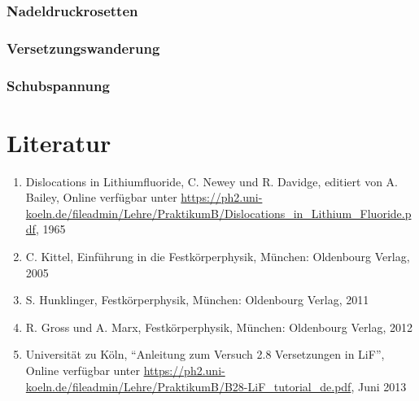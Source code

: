 \documentclass[12pt,a4paper]{scrartcl}
\numberwithin{equation}{section} %
\renewcommand{\[}{} %
\renewcommand{\]}{\noindent} %
\newcommand{\tightlist}{} %
\begin{document}
\hypertarget{nadeldruckrosetten-1}{%
\subsubsection{Nadeldruckrosetten}\label{nadeldruckrosetten-1}}

\hypertarget{versetzungswanderung}{%
\subsubsection{Versetzungswanderung}\label{versetzungswanderung}}

\hypertarget{schubspannung}{%
\subsubsection{Schubspannung}\label{schubspannung}}

\hypertarget{literatur}{%
\section{Literatur}\label{literatur}}

\begin{enumerate}
\def\labelenumi{\arabic{enumi}.}
\tightlist
\item
  Dislocations in Lithiumfluoride, C. Newey und R. Davidge, editiert von
  A. Bailey, Online verfügbar unter
  \url{https://ph2.uni-koeln.de/fileadmin/Lehre/PraktikumB/Dislocations_in_Lithium_Fluoride.pdf},
  1965
\item
  C. Kittel, Einführung in die Festkörperphysik, München: Oldenbourg
  Verlag, 2005
\item
  S. Hunklinger, Festkörperphysik, München: Oldenbourg Verlag, 2011
\item
  R. Gross und A. Marx, Festkörperphysik, München: Oldenbourg Verlag,
  2012
\item
  Universität zu Köln, ``Anleitung zum Versuch 2.8 Versetzungen in
  LiF'', Online verfügbar unter
  \url{https://ph2.uni-koeln.de/fileadmin/Lehre/PraktikumB/B28-LiF_tutorial_de.pdf},
  Juni 2013
\end{enumerate}
\end{document}
